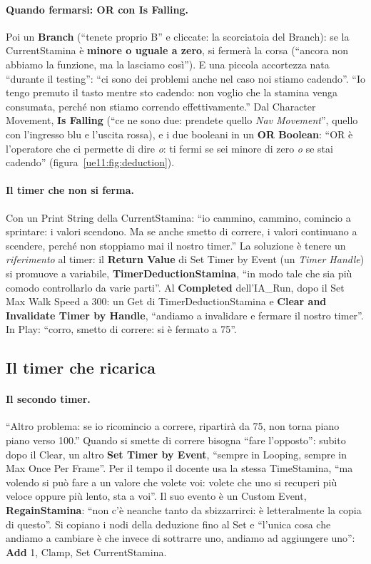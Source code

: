 \paragraph{Quando fermarsi: OR con Is Falling.} Poi un \textbf{Branch} (``tenete proprio
B'' e cliccate: la scorciatoia del Branch): se la CurrentStamina è \textbf{minore o uguale
a zero}, si fermerà la corsa (``ancora non abbiamo la funzione, ma la lasciamo così''). E
una piccola accortezza nata ``durante il testing'': ``ci sono dei problemi anche nel caso
noi stiamo cadendo''. ``Io tengo premuto il tasto mentre sto cadendo: non voglio che la
stamina venga consumata, perché non stiamo correndo effettivamente.'' Dal Character
Movement, \textbf{Is Falling} (``ce ne sono due: prendete quello \emph{Nav Movement}'',
quello con l'ingresso blu e l'uscita rossa), e i due booleani in un \textbf{OR Boolean}:
``OR è l'operatore che ci permette di dire \emph{o}: ti fermi se sei minore di zero
\emph{o} se stai cadendo'' (figura~\ref{ue11:fig:deduction}).

\paragraph{Il timer che non si ferma.} Con un Print String della CurrentStamina: ``io
cammino, cammino, comincio a sprintare: i valori scendono. Ma se anche smetto di correre,
i valori continuano a scendere, perché non stoppiamo mai il nostro timer.'' La soluzione è
tenere un \emph{riferimento} al timer: il \textbf{Return Value} di Set Timer by Event (un
\emph{Timer Handle}) si promuove a variabile, \textbf{TimerDeductionStamina}, ``in modo tale
che sia più comodo controllarlo da varie parti''. Al \textbf{Completed} dell'IA\_Run, dopo
il Set Max Walk Speed a 300: un Get di TimerDeductionStamina e \textbf{Clear and Invalidate
Timer by Handle}, ``andiamo a invalidare e fermare il nostro timer''. In Play: ``corro,
smetto di correre: si è fermato a 75''.

\subsection{Il timer che ricarica}

\paragraph{Il secondo timer.} ``Altro problema: se io ricomincio a correre, ripartirà da 75,
non torna piano piano verso 100.'' Quando si smette di correre bisogna ``fare l'opposto'':
subito dopo il Clear, un altro \textbf{Set Timer by Event}, ``sempre in Looping, sempre in
Max Once Per Frame''. Per il tempo il docente usa la stessa TimeStamina, ``ma volendo si può
fare a un valore che volete voi: volete che uno si recuperi più veloce oppure più lento,
sta a voi''. Il suo evento è un Custom Event, \textbf{RegainStamina}: ``non c'è neanche
tanto da sbizzarrirci: è letteralmente la copia di questo''. Si copiano i nodi della
deduzione fino al Set e ``l'unica cosa che andiamo a cambiare è che invece di sottrarre
uno, andiamo ad aggiungere uno'': \textbf{Add} 1, Clamp, Set CurrentStamina.


